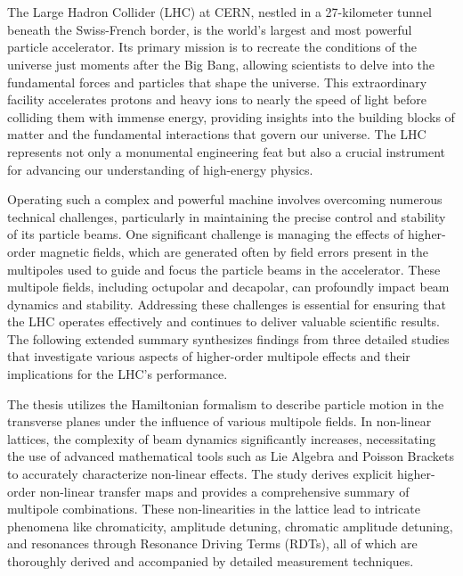 \chapter{}

{
\fontsize{12pt}{17pt}\selectfont

The Large Hadron Collider (LHC) at CERN, nestled in a 27-kilometer tunnel beneath the
Swiss-French border, is the world's largest and most powerful particle accelerator. Its primary
mission is to recreate the conditions of the universe just moments after the Big Bang, allowing
scientists to delve into the fundamental forces and particles that shape the universe. This
extraordinary facility accelerates protons and heavy ions to nearly the speed of light before
colliding them with immense energy, providing insights into the building blocks of matter and the
fundamental interactions that govern our universe. The LHC represents not only a monumental
engineering feat but also a crucial instrument for advancing our understanding of high-energy
physics.

Operating such a complex and powerful machine involves overcoming numerous technical challenges,
particularly in maintaining the precise control and stability of its particle beams. One significant
challenge is managing the effects of higher-order magnetic fields, which are generated often by
field errors present in the multipoles used to guide and focus the particle beams in the
accelerator. These multipole fields, including octupolar and decapolar, can profoundly impact beam
dynamics and stability. Addressing these challenges is essential for ensuring that the LHC operates
effectively and continues to deliver valuable scientific results. The following extended summary
synthesizes findings from three detailed studies that investigate various aspects of higher-order
multipole effects and their implications for the LHC's performance.


The thesis utilizes the Hamiltonian formalism to describe particle motion in the transverse planes
under the influence of various multipole fields. In non-linear lattices, the complexity of beam
dynamics significantly increases, necessitating the use of advanced mathematical tools such as Lie
Algebra and Poisson Brackets to accurately characterize non-linear effects. The study derives
explicit higher-order non-linear transfer maps and provides a comprehensive summary of multipole
combinations. These non-linearities in the lattice lead to intricate phenomena like chromaticity,
amplitude detuning, chromatic amplitude detuning, and resonances through Resonance Driving Terms
(RDTs), all of which are thoroughly derived and accompanied by detailed measurement techniques.

}
